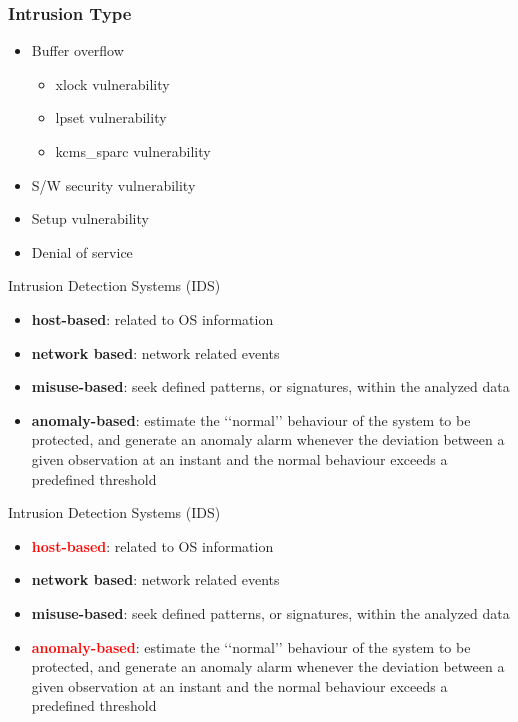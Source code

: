 \documentclass{beamer}
\begin{document}
\begin{frame}
  \frametitle{Intrusion Type}
  \begin{itemize}[label=.]
  \item Buffer overflow
    \begin{itemize}[label=.]
    \item xlock vulnerability
    \item lpset vulnerability
    \item kcms\_sparc vulnerability
    \end{itemize}
  \item S/W security vulnerability
  \item Setup vulnerability
  \item Denial of service
  \end{itemize}
\end{frame}

\begin{frame}{Intrusion Detection Systems (IDS)}
  \begin{itemize}[label=.]
        \item \textbf{host-based}:  related to OS information 
        \item \textbf{network based}:  network related events
  \end{itemize}
  \hspace{1cm}
  \begin{itemize}[label=.]
        \item \textbf{misuse-based}:  seek defined patterns, or signatures, within the analyzed data
        \item \textbf{anomaly-based}:  estimate the ‘‘normal’’ behaviour of the system to be protected, and generate an anomaly alarm whenever the deviation between a given observation at an instant and the normal behaviour exceeds a predefined threshold
\end{itemize}
\end{frame}

\begin{frame}{Intrusion Detection Systems (IDS)}
  \begin{itemize}[label=.]
        \item \textbf{\textcolor{red}{host-based}}:  related to OS information 
        \item \textbf{network based}:  network related events
  \end{itemize}
  \hspace{1cm}
  \begin{itemize}[label=.]
        \item \textbf{misuse-based}:  seek defined patterns, or signatures, within the analyzed data
        \item \textbf{\textcolor{red}{anomaly-based}}:  estimate the ‘‘normal’’ behaviour of the system to be protected, and generate an anomaly alarm whenever the deviation between a given observation at an instant and the normal behaviour exceeds a predefined threshold
\end{itemize}
\end{frame}
\end{document}
